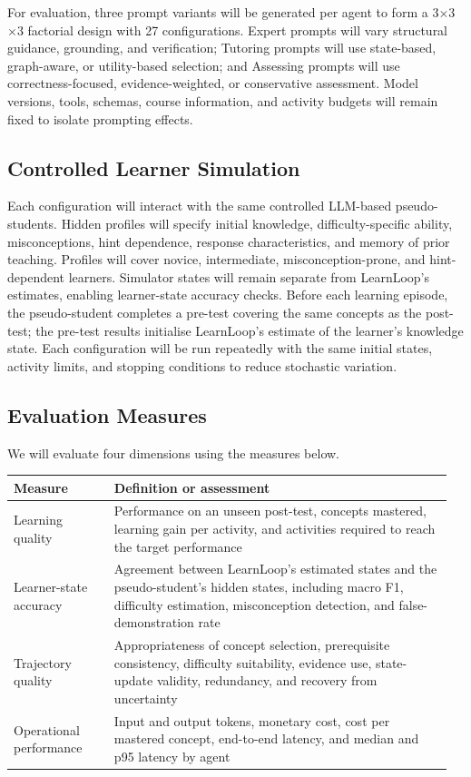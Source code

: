 \documentclass{article}
\begin{document}
For evaluation, three prompt variants will be generated per agent to form a 3$\times$3$\times$3 factorial design with 27 configurations. Expert prompts will vary structural guidance, grounding, and verification; Tutoring prompts will use state-based, graph-aware, or utility-based selection; and Assessing prompts will use correctness-focused, evidence-weighted, or conservative assessment. Model versions, tools, schemas, course information, and activity budgets will remain fixed to isolate prompting effects.

\subsection{Controlled Learner Simulation}

Each configuration will interact with the same controlled LLM-based pseudo-students. Hidden profiles will specify initial knowledge, difficulty-specific ability, misconceptions, hint dependence, response characteristics, and memory of prior teaching. Profiles will cover novice, intermediate, misconception-prone, and hint-dependent learners. Simulator states will remain separate from LearnLoop's estimates, enabling learner-state accuracy checks. Before each learning episode, the pseudo-student completes a pre-test covering the same concepts as the post-test; the pre-test results initialise LearnLoop's estimate of the learner's knowledge state. Each configuration will be run repeatedly with the same initial states, activity limits, and stopping conditions to reduce stochastic variation.

\subsection{Evaluation Measures}

We will evaluate four dimensions using the measures below.

{\small
\begin{tabular}{@{}>{\raggedright\arraybackslash}p{0.22\linewidth}>{\raggedright\arraybackslash}p{0.74\linewidth}@{}}
\toprule
\textbf{Measure} & \textbf{Definition or assessment} \\
\midrule
Learning quality & Performance on an unseen post-test, concepts mastered, learning gain per activity, and activities required to reach the target performance \\
Learner-state accuracy & Agreement between LearnLoop's estimated states and the pseudo-student's hidden states, including macro F1, difficulty estimation, misconception detection, and false-demonstration rate \\
Trajectory quality & Appropriateness of concept selection, prerequisite consistency, difficulty suitability, evidence use, state-update validity, redundancy, and recovery from uncertainty \\
Operational performance & Input and output tokens, monetary cost, cost per mastered concept, end-to-end latency, and median and p95 latency by agent \\
\bottomrule
\end{tabular}
}
\end{document}

